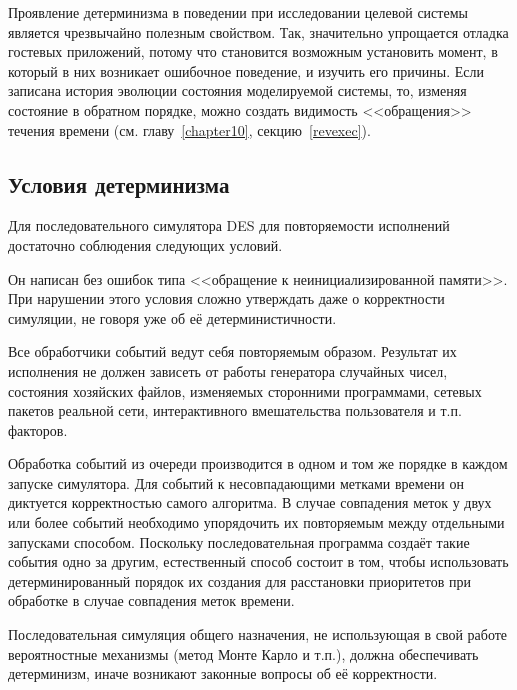 Проявление детерминизма в поведении при исследовании целевой системы является чрезвычайно полезным свойством. Так, значительно упрощается отладка гостевых приложений, потому что становится возможным установить момент, в который в них возникает ошибочное поведение, и изучить его причины. Если записана история эволюции состояния моделируемой системы, то, изменяя состояние в обратном порядке, можно создать видимость <<обращения>> течения времени (см. главу~\ref{chapter10}, секцию~\ref{revexec}).

\subsection{Условия детерминизма}

Для последовательного симулятора DES для повторяемости исполнений достаточно соблюдения следующих условий.
\begin{enumerate*}
\item Он написан без ошибок типа <<обращение к неинициализированной памяти>>. При нарушении этого условия сложно утверждать даже о корректности симуляции, не говоря уже об её детерминистичности.
\item Все обработчики событий ведут себя повторяемым образом. Результат их исполнения не должен зависеть от работы генератора случайных чисел, состояния хозяйских файлов, изменяемых сторонними программами, сетевых пакетов реальной сети, интерактивного вмешательства пользователя и т.п. факторов.
\item Обработка событий из очереди производится в одном и том же порядке в каждом запуске симулятора.  Для событий к несовпадающими метками времени он диктуется корректностью самого алгоритма. В случае совпадения меток у двух или более событий необходимо упорядочить их повторяемым между отдельными запусками способом. Поскольку последовательная программа создаёт такие события одно за другим, естественный способ состоит в том, чтобы использовать детерминированный порядок их создания для расстановки приоритетов при обработке в случае совпадения меток времени.
\end{enumerate*}

Последовательная симуляция общего назначения, не использующая в свой работе вероятностные механизмы (метод Монте Карло и т.п.), должна обеспечивать детерминизм, иначе возникают законные вопросы об её корректности.

